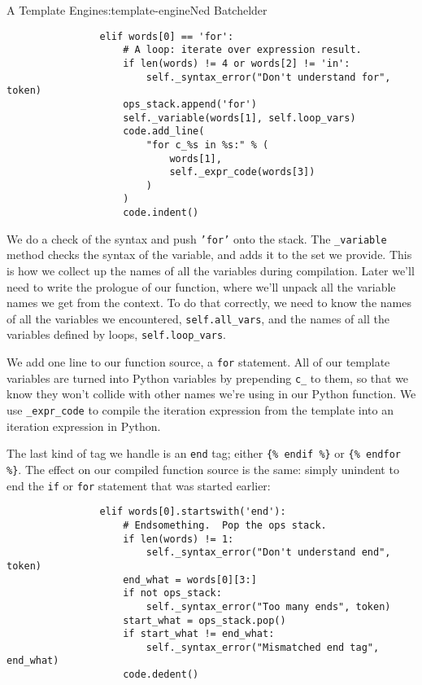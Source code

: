 \begin{aosachapter}{A Template Engine}{s:template-engine}{Ned Batchelder}
\begin{verbatim}
                elif words[0] == 'for':
                    # A loop: iterate over expression result.
                    if len(words) != 4 or words[2] != 'in':
                        self._syntax_error("Don't understand for", token)
                    ops_stack.append('for')
                    self._variable(words[1], self.loop_vars)
                    code.add_line(
                        "for c_%s in %s:" % (
                            words[1],
                            self._expr_code(words[3])
                        )
                    )
                    code.indent()
\end{verbatim}

We do a check of the syntax and push \texttt{'for'} onto the stack. The
\texttt{\_variable} method checks the syntax of the variable, and adds
it to the set we provide. This is how we collect up the names of all the
variables during compilation. Later we'll need to write the prologue of
our function, where we'll unpack all the variable names we get from the
context. To do that correctly, we need to know the names of all the
variables we encountered, \texttt{self.all\_vars}, and the names of all
the variables defined by loops, \texttt{self.loop\_vars}.

We add one line to our function source, a \texttt{for} statement. All of
our template variables are turned into Python variables by prepending
\texttt{c\_} to them, so that we know they won't collide with other
names we're using in our Python function. We use \texttt{\_expr\_code}
to compile the iteration expression from the template into an iteration
expression in Python.

The last kind of tag we handle is an \texttt{end} tag; either
\texttt{\{\% endif \%\}} or \texttt{\{\% endfor \%\}}. The effect on our
compiled function source is the same: simply unindent to end the
\texttt{if} or \texttt{for} statement that was started earlier:

\begin{verbatim}
                elif words[0].startswith('end'):
                    # Endsomething.  Pop the ops stack.
                    if len(words) != 1:
                        self._syntax_error("Don't understand end", token)
                    end_what = words[0][3:]
                    if not ops_stack:
                        self._syntax_error("Too many ends", token)
                    start_what = ops_stack.pop()
                    if start_what != end_what:
                        self._syntax_error("Mismatched end tag", end_what)
                    code.dedent()
\end{verbatim}


\end{aosachapter}

